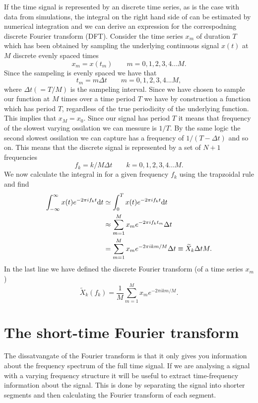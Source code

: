 If the time signal is represented by an discrete time series, as is the case with data from simulations,
the integral on the right hand side of  can be estimated by numerical integration and 
we can derive an expression for the correspodning discrete Fourier transform (DFT).
Consider the time series $x_m$ of duration $T$ which has been obtained by sampling the underlying 
continuous signal $x(t)$ at $M$ discrete evenly spaced times
\begin{equation}
x_m = x(t_m) \qquad m = 0,1,2,3,4 ... M.
\end{equation} 
Since the sampeling is evenly spaced we have that 
\begin{equation}
t_m = m\Delta t \qquad m = 0,1,2,3,4 ... M,
\end{equation} 
where $\Delta t( = T/M)$ is the sampeling interval.
Since we have chosen to sample our function at $M$ times over a time period
$T$ we have by construction a function which has period $T$, regardless of the true periodicity of the
underlying function. This implies that $x_M = x_0$. Since our signal has period $T$ it means that frequency
of the slowest varying ossilation we can messure is $1/T$. By the same logic the second slowest ossilation 
we can capture has a frequency of $1/(T-\Delta t)$ and so on. This means that the discrete signal
is represented by a set of $N+1$ frequencies 
\begin{equation}
f_k = k/M \Delta t \qquad k = 0,1,2,3,4 ... M.
\end{equation}
We now calculate the integral in  for a given frequency $f_k$ using the trapzoidal rule and find
\begin{align}
\int_{-\infty}^{\infty} x(t) e^{-2 \pi i f_k t} \mathrm{d} t &\simeq \int_{0}^{T} x(t) e^{-2 \pi i f_k t} \mathrm{d} t \nonumber \\
&\approx \sum_{m=1}^{M} x_m e^{-2 \pi i f_k t_m} \Delta t \nonumber \\
& = \sum_{m=1}^{M} x_m e^{-2 \pi i k m/M} \Delta t \equiv \widetilde{X}_k \Delta t M.
\end{align}
In the last line we have defined the discrete Fourier transform (of a time series $x_m$)
\begin{equation} \label{eq:DFT}
\widetilde{X}_k (f_k) = \frac{1}{M}  \sum^M_{m=1} x_m e^{-2\pi i k m/M}.
\end{equation}

\section{The short-time Fourier transform}
The dissatvangate of the Fourier transform is that it only gives you information
about the frequency spectrum of the full time signal. If we are analysing a 
signal with a varying frequency structure it will be useful to extract 
time-frequency information about the signal. This is done by separating
the signal into shorter segments and then calculating the Fourier transform of each
segment.
